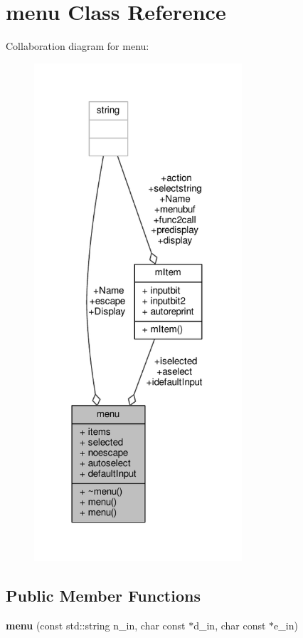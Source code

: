 \hypertarget{classmenu}{}\section{menu Class Reference}
\label{classmenu}


Collaboration diagram for menu\+:
\nopagebreak
\begin{figure}[H]
\begin{center}
\leavevmode
\includegraphics[width=219pt]{d0/d37/classmenu__coll__graph}
\end{center}
\end{figure}
\subsection*{Public Member Functions}
\begin{DoxyCompactItemize}
\item 
{\bfseries menu} (const std\+::string n\+\_\+in, char const $\ast$d\+\_\+in, char const $\ast$e\+\_\+in)\hypertarget{classmenu_ab2cf2dd2184f6d14b990e35377a004e7}{}\label{classmenu_ab2cf2dd2184f6d14b990e35377a004e7}

\end{DoxyCompactItemize}

